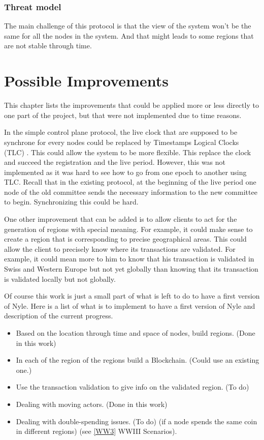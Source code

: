 \documentclass[a4paper,11pt,oneside]{report}
\begin{document}
\subsection{Threat model}
The main challenge of this protocol is that the view of the system won't be the
same for all the nodes in the system. And that might leads to some regions that
are not stable through time. 


\chapter{Possible Improvements}

This chapter lists the improvements that could be applied more or less directly
to one part of the project, but that were not implemented due to time reasons. 

In the simple control plane protocol, the live clock that are supposed to be
synchrone for every nodes could be replaced by Timestamps Logical Clocks (TLC)
\cite{Ford2019}. This could allow the system to be more flexible.
This replace the clock and succeed the registration and the live period.
However, this was not implemented as it was hard to see how to go from one
epoch to another using TLC. Recall that in the existing protocol, at the
beginning of the live period one node of the old committee sends the necessary
information to the new committee to begin. Synchronizing this could be hard.

One other improvement that can be added is to allow clients to act for the
generation of regions with special meaning. For example, it could make sense to
create a region that is corresponding to precise geographical areas. This could
allow the client to precisely know where its transactions are validated. For
example, it could mean more to him to know that his transaction is validated in
Swiss and Western Europe but not yet globally than knowing that its transaction
is validated locally but not globally. 

Of course this work is just a small part of what is left to do to have a first
version of Nyle. Here is a list of what is to implement to have a first version
of Nyle and description of the current progress.

\begin{itemize} 
\item Based on the location through time and space of nodes, build regions.
(Done in this work)
\item In each of the region of the regions build a Blockchain. (Could use an
    existing one.)
\item Use the transaction validation to give info on the validated region. (To
do) 
\item Dealing with moving actors. (Done in this work)
\item Dealing with double-spending issues. (To do)
(if a node spends the same coin in different regions) 
(see \autoref{WW3} WWIII Scenarios). 
\end{itemize}
\end{document}

